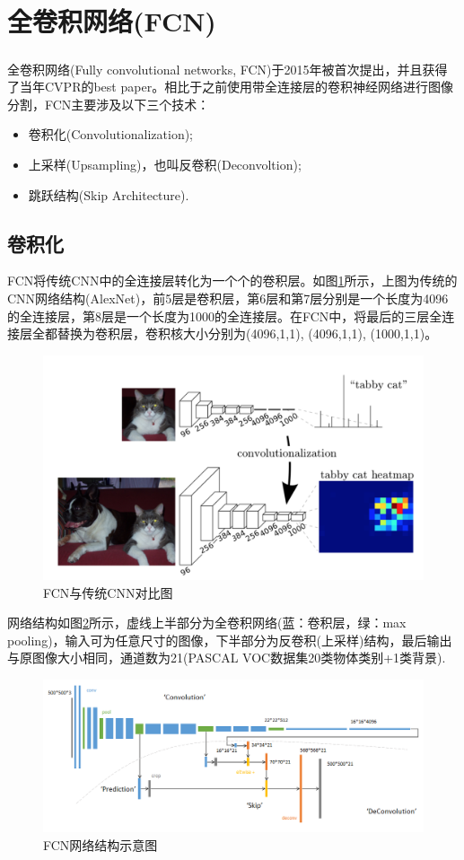 \documentclass[cn]{elegantbook}
\newcommand{\upcite}[1]{\textsuperscript{\textsuperscript{\cite{#1}}}}
\begin{document}
\section{全卷积网络(FCN)}
全卷积网络(Fully convolutional networks, FCN\upcite{long2015fully})于2015年被首次提出，并且获得了当年CVPR的best paper。相比于之前使用带全连接层的卷积神经网络进行图像分割，FCN主要涉及以下三个技术：
\begin{itemize}
	\item 卷积化(Convolutionalization);
	\item 上采样(Upsampling)，也叫反卷积(Deconvoltion);
	\item 跳跃结构(Skip Architecture).
\end{itemize}

\subsection{卷积化}
FCN将传统CNN中的全连接层转化为一个个的卷积层。如图\ref{fcn}所示，上图为传统的CNN网络结构(AlexNet\cite{krizhevsky2012imagenet})，前5层是卷积层，第6层和第7层分别是一个长度为4096的全连接层，第8层是一个长度为1000的全连接层。在FCN中，将最后的三层全连接层全都替换为卷积层，卷积核大小分别为(4096,1,1), (4096,1,1), (1000,1,1)。

\begin{figure}[!h]
	\centering
	\includegraphics[width=\textwidth]{images/fcn}
	\caption{\label{fcn}FCN与传统CNN对比图}
\end{figure}

网络结构如图\ref{fcn1}所示，虚线上半部分为全卷积网络(蓝：卷积层，绿：max pooling)，输入可为任意尺寸的图像，下半部分为反卷积(上采样)结构，最后输出与原图像大小相同，通道数为21(PASCAL VOC数据集20类物体类别+1类背景).

\begin{figure}[!h]
	\centering
	\includegraphics[width=\textwidth]{images/fcn1}
	\caption{\label{fcn1}FCN网络结构示意图}
\end{figure}
\end{document}
